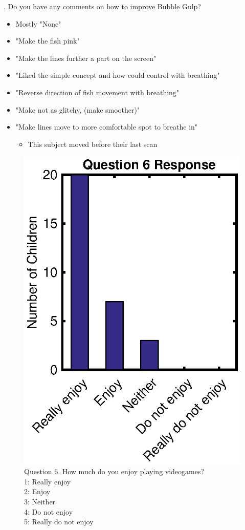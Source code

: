 \begin{appendices}
	.	Do you have any comments on how to improve Bubble Gulp?
	\begin{itemize}
		\item Mostly "None"
		\item "Make the fish pink"
		\item "Make the lines further a part on the screen"
		\item "Liked the simple concept and how could control with breathing"
		\item "Reverse direction of fish movement with breathing"
		\item "Make not as glitchy, (make smoother)"
		\item "Make lines move to more comfortable spot to breathe in"
		\begin{itemize}
			\item This subject moved before their last scan
		\end{itemize}
	\end{itemize}
	
	\begin{figure}
		\centering
		\includegraphics{figures/gamepaper/Question6}
		\caption[Survey Question 6]{Question 6. How much do you enjoy playing videogames? \\ 1: Really enjoy\\ 2: Enjoy\\ 3: Neither\\ 4: Do not enjoy \\ 5: Really do not enjoy}
		\label{fig:question6}
	\end{figure}


\end{appendices}

